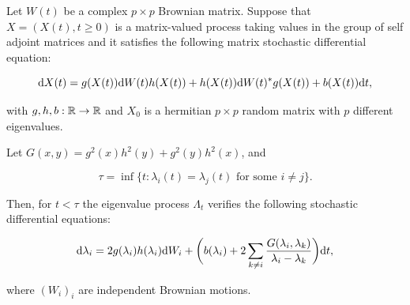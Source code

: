 \begin{theorem} \label{thm:diffusion_complejo}
    Let $W(t)$ be a complex $p\times p$ Brownian matrix. Suppose that $X = (X(t), t \ge 0)$ is a matrix-valued process taking values in the group of self adjoint matrices and it satisfies the following matrix stochastic differential equation:

    \begin{equation}\label{eq:complex_diff}
        \mathrm d X(t) = g(X(t))\mathrm d  W(t) h(X(t)) + h(X(t))\mathrm d W(t)^* g(X(t)) + b(X(t))\mathrm d t,
    \end{equation}

    \noindent with $g,h,b: \mathbb R \to \mathbb R$ and $X_0$ is a hermitian $p\times p$ random matrix with $p$ different eigenvalues.

    Let $G(x,y) = g^2(x)h^2(y) + g^2(y)h^2(x)$, and
    
    \[ \tau = \inf\{ t: \lambda_i(t) = \lambda_j(t) \text{ for some } i\neq j \}. \]
    
    Then, for $t < \tau$ the eigenvalue process $\Lambda_t$ verifies the following stochastic differential equations:

    \begin{equation}
        \mathrm d \lambda_i = 2g(\lambda_i)h(\lambda_i)\mathrm d W_i + \biggl( b(\lambda_i) + 2\sum_{k\neq i} \frac{G(\lambda_i,\lambda_k)}{\lambda_i - \lambda_k} \biggr)\mathrm d t,
    \end{equation}

    \noindent where $(W_i)_{i}$ are independent Brownian motions.
\end{theorem}

